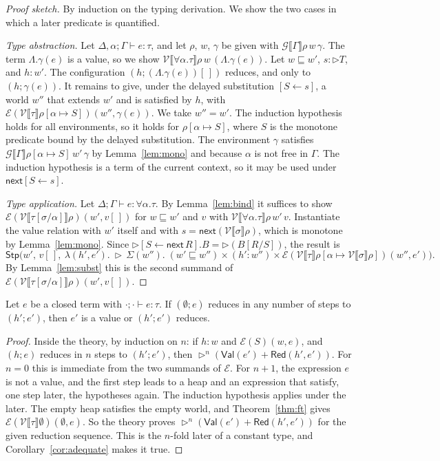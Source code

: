 \documentclass[acmsmall,nonacm,screen]{acmart}
\newcommand{\later}{{\triangleright}}
\newcommand{\nxt}{\mathsf{next}}
\newcommand{\sem}[1]{\llbracket #1 \rrbracket}
\newcommand{\kw}[1]{\mathsf{#1}}
\newcommand{\dsub}[2]{[#1 \leftarrow #2]}
\newcommand{\Pred}{T}
\newcommand{\Stp}{\mathsf{Stp}}
\newcommand{\Er}{\mathcal{E}}
\newcommand{\Vr}{\mathcal{V}}
\newcommand{\Gr}{\mathcal{G}}
\newcommand{\ext}{\sqsubseteq}
\begin{document}
\begin{proof}[Proof sketch]
By induction on the typing derivation. We show the two cases in which a later predicate is
quantified.

\emph{Type abstraction.} Let $\Delta,\alpha;\Gamma \vdash e : \tau$, and let $\rho$, $w$,
$\gamma$ be given with $\Gr\sem{\Gamma}\rho\,w\,\gamma$. The term $\Lambda.\gamma(e)$ is a
value, so we show $\Vr\sem{\forall\alpha.\tau}\rho\,w\,(\Lambda.\gamma(e))$. Let $w \ext w'$,
$s : \later\Pred$, and $h : w'$. The configuration $(h;(\Lambda.\gamma(e))[\,])$ reduces, and
only to $(h;\gamma(e))$. It remains to give, under the delayed substitution
$\dsub{S}{s}$, a world $w''$ that extends $w'$ and is satisfied by $h$, with
$\Er(\Vr\sem{\tau}\rho[\alpha \mapsto S])(w'',\gamma(e))$. We take $w'' = w'$. The induction
hypothesis holds for all environments, so it holds for $\rho[\alpha \mapsto S]$, where $S$
is the monotone predicate bound by the delayed substitution. The environment $\gamma$
satisfies $\Gr\sem{\Gamma}\rho[\alpha \mapsto S]\,w'\,\gamma$ by Lemma~\ref{lem:mono} and
because $\alpha$ is not free in $\Gamma$. The induction hypothesis is a term of the current
context, so it may be used under $\nxt\dsub{S}{s}$.

\emph{Type application.} Let $\Delta;\Gamma \vdash e : \forall\alpha.\tau$. By
Lemma~\ref{lem:bind} it suffices to show $\Er(\Vr\sem{\tau[\sigma/\alpha]}\rho)(w',v[\,])$
for $w \ext w'$ and $v$ with $\Vr\sem{\forall\alpha.\tau}\rho\,w'\,v$. Instantiate the
value relation with $w'$ itself and with $s = \nxt(\Vr\sem{\sigma}\rho)$, which is monotone
by Lemma~\ref{lem:mono}. Since
$\later\dsub{S}{\nxt\,R}.B = \later(B[R/S])$, the result is
\[
  \Stp\bigl(w',\,v[\,],\ \lambda(h',e').\ \later\,\Sigma(w'').\; (w' \ext w'') \times (h' : w'') \times
     \Er(\Vr\sem{\tau}\rho[\alpha \mapsto \Vr\sem{\sigma}\rho])(w'',e')\bigr).
\]
By Lemma~\ref{lem:subst} this is the second summand of
$\Er(\Vr\sem{\tau[\sigma/\alpha]}\rho)(w',v[\,])$.
\end{proof}

\begin{theorem}\label{thm:safety}
Let $e$ be a closed term with ${\cdot};{\cdot} \vdash e : \tau$. If $(\emptyset;e)$ reduces
in any number of steps to $(h';e')$, then $e'$ is a value or $(h';e')$ reduces.
\end{theorem}

\begin{proof}
Inside the theory, by induction on $n$: if $h : w$ and $\Er(S)(w,e)$, and $(h;e)$ reduces
in $n$ steps to $(h';e')$, then $\later^n(\kw{Val}(e') + \kw{Red}(h',e'))$. For $n = 0$ this
is immediate from the two summands of $\Er$. For $n+1$, the expression $e$ is not a value,
and the first step leads to a heap and an expression that satisfy, one step later, the
hypotheses again. The induction hypothesis applies under the later. The empty heap satisfies
the empty world, and Theorem~\ref{thm:ft} gives $\Er(\Vr\sem{\tau}\emptyset)(\emptyset,e)$.
So the theory proves $\later^n(\kw{Val}(e') + \kw{Red}(h',e'))$ for the given reduction
sequence. This is the $n$-fold later of a constant type, and Corollary~\ref{cor:adequate}
makes it true.
\end{proof}
\end{document}
